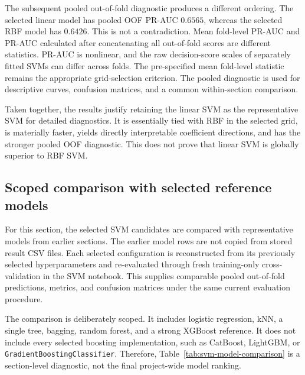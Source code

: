 The subsequent pooled out-of-fold diagnostic produces a different ordering. The selected linear model has pooled OOF PR-AUC \(0.6565\), whereas the selected RBF model has \(0.6426\). This is not a contradiction. Mean fold-level PR-AUC and PR-AUC calculated after concatenating all out-of-fold scores are different statistics. PR-AUC is nonlinear, and the raw decision-score scales of separately fitted SVMs can differ across folds. The pre-specified mean fold-level statistic remains the appropriate grid-selection criterion. The pooled diagnostic is used for descriptive curves, confusion matrices, and a common within-section comparison.

Taken together, the results justify retaining the linear SVM as the representative SVM for detailed diagnostics. It is essentially tied with RBF in the selected grid, is materially faster, yields directly interpretable coefficient directions, and has the stronger pooled OOF diagnostic. This does not prove that linear SVM is globally superior to RBF SVM.

\subsection{Scoped comparison with selected reference models}

For this section, the selected SVM candidates are compared with representative models from earlier sections. The earlier model rows are not copied from stored result CSV files. Each selected configuration is reconstructed from its previously selected hyperparameters and re-evaluated through fresh training-only cross-validation in the SVM notebook. This supplies comparable pooled out-of-fold predictions, metrics, and confusion matrices under the same current evaluation procedure.

The comparison is deliberately scoped. It includes logistic regression, kNN, a single tree, bagging, random forest, and a strong XGBoost reference. It does not include every selected boosting implementation, such as CatBoost, LightGBM, or \texttt{GradientBoostingClassifier}. Therefore, Table~\ref{tab:svm-model-comparison} is a section-level diagnostic, not the final project-wide model ranking.

